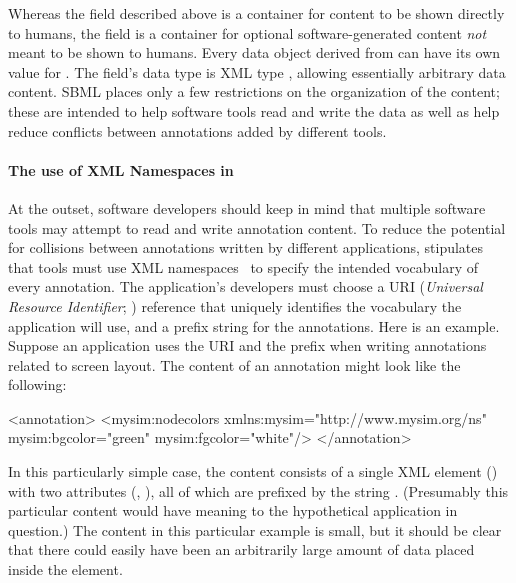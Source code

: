 Whereas the  field described above is a container for
content to be shown directly to humans, the 
field is a container for optional software-generated content
\emph{not} meant to be shown to humans.  Every data object derived
from \SBase can have its own value for .  The
field's data type is XML type , allowing essentially
arbitrary data content.  SBML places only a few restrictions on
the organization of the content; these are intended to help
software tools read and write the data as well as help reduce
conflicts between annotations added by different tools.


\paragraph{The use of XML Namespaces in }


At the outset, software developers should keep in mind that
multiple software tools may attempt to read and write annotation
content.  To reduce the potential for collisions between
annotations written by different applications, \sbmltwotwo
stipulates that tools must use XML namespaces~\citep{bray:1999} to
specify the intended vocabulary of every annotation.  The
application's developers must choose a URI (\emph{Universal
  Resource Identifier}; \citealt{harold:2001,w3c:2000}) reference
that uniquely identifies the vocabulary the application will use,
and a prefix string for the annotations.  Here is an example.
Suppose an application uses the URI 
and the prefix  when writing annotations related to
screen layout.  The content of an annotation might look like the
following:

\begin{example}
<annotation>
    <mysim:nodecolors xmlns:mysim="http://www.mysim.org/ns"
         mysim:bgcolor="green"
         mysim:fgcolor="white"/>
</annotation>
\end{example}

In this particularly simple case, the content consists of a single
XML element () with two attributes
(, ), all of which are prefixed by
the string .  (Presumably this particular content
would have meaning to the hypothetical application in question.)
The content in this particular example is small, but it should be
clear that there could easily have been an arbitrarily large
amount of data placed inside the  element.

